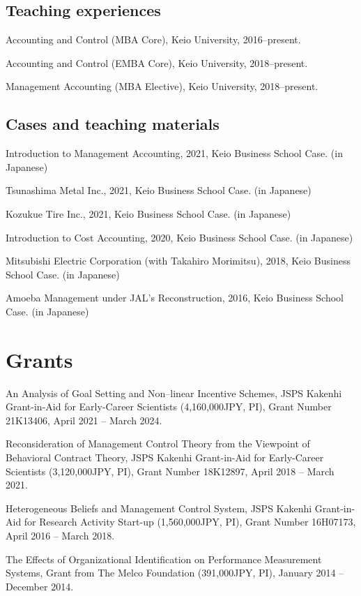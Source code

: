 \documentclass[letterpaper,uplatex]{article}
\renewenvironment{itemize}{
  \begin{list}{}{
    \setlength{\leftmargin}{1.5em}
  }
}{
  \end{list}
}
\begin{document}
\subsection*{Teaching experiences}

\begin{itemize}
	\item Accounting and Control (MBA Core), Keio University, 2016--present.
	\item Accounting and Control (EMBA Core), Keio University, 2018--present.
	\item Management Accounting (MBA Elective), Keio University, 2018--present.
\end{itemize}

\subsection*{Cases and teaching materials}

\begin{itemize}
    \item Introduction to Management Accounting, 2021, Keio Business School Case. (in Japanese)
    \item Tsunashima Metal Inc., 2021, Keio Business School Case. (in Japanese)
    \item Kozukue Tire Inc., 2021, Keio Business School Case. (in Japanese)
   \item Introduction to Cost Accounting, 2020, Keio Business School Case. (in Japanese)
   \item Mitsubishi Electric Corporation (with Takahiro Morimitsu), 2018, Keio Business School Case. (in Japanese)
   \item Amoeba Management under JAL's Reconstruction, 2016, Keio Business School Case. (in Japanese)
\end{itemize}

\section*{Grants}

\begin{itemize}
\item An Analysis of Goal Setting and Non--linear Incentive Schemes, JSPS Kakenhi Grant-in-Aid for Early-Career Scientists (4,160,000JPY, PI), Grant Number 21K13406, April 2021 -- March 2024.

\item Reconsideration of Management Control Theory from the Viewpoint of Behavioral Contract Theory, JSPS Kakenhi Grant-in-Aid for Early-Career Scientists (3,120,000JPY, PI), Grant Number 18K12897, April 2018 -- March 2021.

\item Heterogeneous Beliefs and Management Control System, JSPS Kakenhi Grant-in-Aid for Research Activity Start-up (1,560,000JPY, PI), Grant Number 16H07173, April 2016 -- March 2018.

\item The Effects of Organizational Identification on Performance Measurement Systems, Grant from The Melco Foundation (391,000JPY, PI), January 2014 -- December 2014.
\end{itemize}
\end{document}
